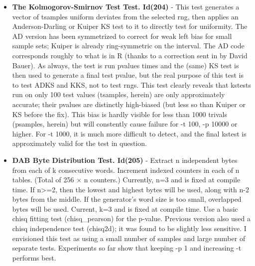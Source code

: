 \begin{itemize}
   \item \textbf{The Kolmogorov-Smirnov Test Test. Id(204)} - This test generates a vector of tsamples uniform deviates from the selected rng, then applies an Anderson-Darling or Kuiper KS test to it to directly test for uniformity.  The AD version has been symmetrized to correct for weak left bias for small sample sets; Kuiper is already ring-symmetric on the interval.  The AD code corresponds roughly to what is in R (thanks to a correction sent in by David Bauer). As always, the test is run pvalues times and the (same) KS test is then used to generate a final test pvalue, but the real purpose of this test is to test ADKS and KKS, not to test rngs.  This test clearly reveals that kstests run on only 100 test values (tsamples, herein) are only approximately accurate; their pvalues are distinctly high-biased (but less so than Kuiper or KS before the fix).  This bias is hardly visible for less than 1000 trivals (psamples, herein) but will constently cause failure for -t 100, -p 10000 or higher.  For -t 1000, it is much more difficult to detect, and the final kstest is approximately valid for the test in question.
   
   \item \textbf{DAB Byte Distribution Test. Id(205)} - Extract n independent bytes from each of k consecutive words. Increment indexed counters in each of n tables.  (Total of 256 $\times$ n counters.) Currently, n=3 and is fixed at compile time. If n>=2, then the lowest and highest bytes will be used, along with n-2 bytes from the middle. If the generator's word size is too small, overlapped bytes will be used. Current, k=3 and is fixed at compile time. Use a basic chisq fitting test (chisq\_pearson) for the p-value. Previous version also used a chisq independence test (chisq2d); it was found to be slightly less sensitive. I envisioned this test as using a small number of samples and large number of separate tests. Experiments so far show that keeping -p 1 and increasing -t performs best.
   

\end{itemize}
